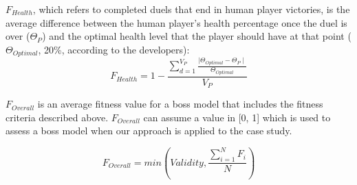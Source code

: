 $F_{Health}$, which refers to completed duels that end in human player victories, is the average difference between the human player's health percentage once the duel is over ($\Theta_{P}$) and the optimal health level that the player should have at that point ($\Theta_{Optimal}$, 20\%, according to the developers):
\begin{equation}
F_{Health} = 1 - \frac{\sum\limits_{d=1}^{V_{P}}\frac{\mid \Theta_{Optimal} - \Theta_{P} \mid}{ \Theta_{Optimal}}}{V_{P}}
\end{equation}

$F_{Overall}$ is an average fitness value for a boss model that includes the fitness criteria described above. $F_{Overall}$ can assume a value in [0, 1] which is used to assess a boss model when our \ApproachName{} approach is applied to the \CaseStudy{} case study.

\begin{equation}
F_{Overall} = min( Validity, \frac{\sum\limits_{i=1}^{N}F_{i}}{N} )
\end{equation}
